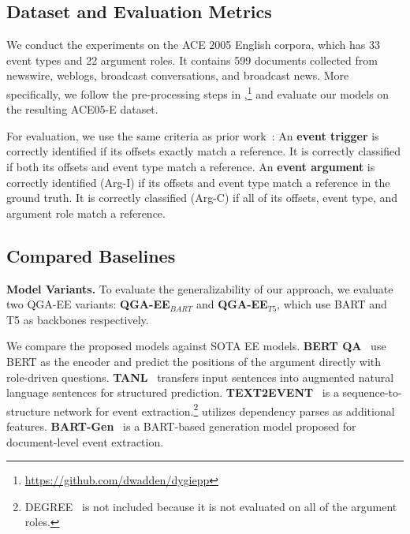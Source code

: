 \subsection{Dataset and Evaluation Metrics}

        

        
   
 

We conduct the experiments on the ACE 2005 English corpora,
which has 33 event types and 22 argument roles. It contains 599 documents collected from newswire, weblogs, broadcast conversations, and broadcast news.
More specifically, we follow the pre-processing steps in \citet{wadden2019entity},\footnote{\url{https://github.com/dwadden/dygiepp}} and evaluate our models on the resulting ACE05-E dataset. 

 For evaluation, we use the same criteria as prior work~\cite{li2013joint}: An \textbf{event trigger} is correctly identified if its offsets exactly match a reference. It is correctly classified if both its offsets and event type match a reference. An \textbf{event argument} is correctly identified (Arg-I) if its offsets and event type match a reference in the ground truth. It is correctly classified (Arg-C) if all of its offsets, event type, and argument role match a reference.
 
\subsection{Compared Baselines}
\noindent\textbf{Model Variants.} To evaluate the generalizability of our approach, we evaluate two QGA-EE variants: \textbf{QGA-EE$_{BART}$} and \textbf{QGA-EE$_{T5}$}, which use BART and T5 as backbones respectively.

We compare the proposed models against SOTA EE models. \textbf{BERT QA}~\cite{du2020event} use BERT as the encoder and predict the positions of the argument directly with role-driven questions.
\textbf{TANL}~\cite{paolini2021structured} transfers input sentences into augmented natural language sentences for structured prediction. \textbf{TEXT2EVENT}~\cite{lu2021text2event} is a sequence-to-structure network for event extraction.\footnote{DEGREE~\cite{hsudegree} is not included because it is not evaluated on all of the argument roles.} \citet{ma2020resource} utilizes dependency parses as additional features. \textbf{BART-Gen}~\cite{li2021document} is a BART-based generation model proposed for document-level event extraction.

